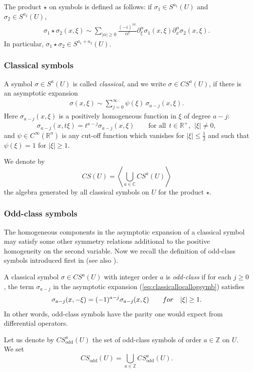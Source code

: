 \documentclass[11pt]{article}
\DeclareMathOperator{\odd}{odd} \DeclareMathOperator{\supp}{supp}
\begin{document}
The product $\star$ on symbols is def\/ined as follows: if $\sigma_1 \in S^{a_1}(U)$ and $\sigma_2\in S^{a_2}(U)$,
\begin{gather}
\sigma_1\star \sigma_2(x, \xi) \sim \sum_{|\alpha|\geq0}\frac{(-i)^{\vert\alpha\vert}}{\alpha!}\partial_{\xi}^{\alpha} \sigma_1(x,\xi)\partial_x^{\alpha}\sigma_2(x,\xi). \label{eq:starproduct}
\end{gather}
In particular, $\sigma_1\star \sigma_2 \in S^{a_1 + a_2}(U)$.

\subsubsection{Classical symbols}\label{sectionsymbols}

A symbol $ \sigma\in S^a(U)$ is called  {\it classical}, and we write $\sigma\in CS^a(U)$, if there is an asymptotic expansion
\begin{gather}
\sigma(x,\xi) \sim \sum_{j=0}^{\infty}\psi(\xi)\, \sigma_{a-j}(x,\xi). \label{eq:classicallocallogsymb}
\end{gather}
Here $\sigma_{a-j}(x,\xi)$ is a positively homogeneous function in $\xi$ of degree $a-j$:
\[
\sigma_{a-j}(x,t\xi)=t^{a-j}\sigma_{a-j}(x,\xi) \qquad \text{for all}  \ \ t\in\mathbb{R}^+, \ \ \vert \xi\vert \not=0,
\]
and $\psi\in C^{\infty}(\mathbb{R}^n)$ is any cut-of\/f function which vanishes for $\vert \xi \vert \leq \frac{1}{2}$ and such that $\psi(\xi)=1$ for $\vert \xi\vert \geq 1$.

We denote by
\[
CS(U)=\left\langle \bigcup_{a\in \mathbb{C}} CS^a(U)\right\rangle
\]
the algebra generated by all classical symbols on $U$ for the product $\star$.

\subsubsection{Odd-class symbols}

The homogeneous components in the asymptotic expansion of a classical symbol may satisfy some other symmetry relations additional to the positive homogeneity on the second variable. Now we recall the def\/inition of odd-class symbols introduced f\/irst in \cite{kontsevichdeterminant} (see also \cite{grubb}).

\begin{definition}
A classical symbol $\sigma\in {CS}^{a}(U)$ with integer order $a$ is \emph{odd-class} if for each $j\geq 0$, the term $\sigma_{a-j}$ in the asymptotic expansion (\ref{eq:classicallocallogsymb}) satisf\/ies
\begin{gather}
\sigma_{a-j}(x,-\xi)=(-1)^{a-j}\sigma_{a-j}(x,\xi) \qquad {\rm for}\quad \vert \xi\vert \geq 1. \label{eq:OddlogPolyhom}
\end{gather}
In other words, odd-class symbols have the parity one would expect from dif\/ferential operators.
\end{definition}
Let us denote by $CS_{\odd}^a(U)$ the set of odd-class symbols of order $a\in \mathbb{Z}$ on $U$. We set
\[
CS_{\odd}(U)=\bigcup_{a\in \mathbb{Z}} CS_{\odd}^a(U).
\]
\end{document}

